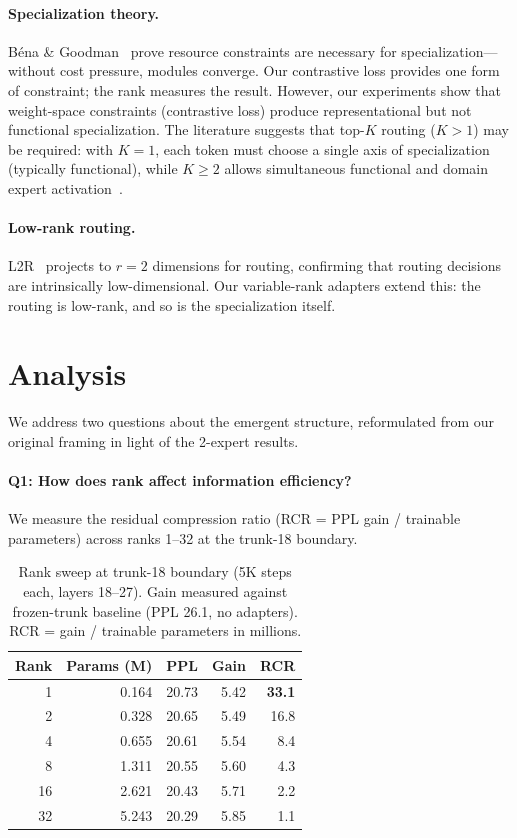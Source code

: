 \documentclass{article}
\begin{document}
\paragraph{Specialization theory.}
B\'{e}na \& Goodman~\cite{bena2025modularity} prove resource constraints are
necessary for specialization---without cost pressure, modules converge. Our
contrastive loss provides one form of constraint; the rank measures the result.
However, our experiments show that weight-space constraints (contrastive loss)
produce representational but not functional specialization. The literature
suggests that top-$K$ routing ($K > 1$) may be required: with $K=1$, each
token must choose a single axis of specialization (typically functional), while
$K \geq 2$ allows simultaneous functional and domain expert
activation~\cite{standing2026, domaindriver2026}.

\paragraph{Low-rank routing.}
L2R~\cite{l2r2026} projects to $r{=}2$ dimensions for routing, confirming that
routing decisions are intrinsically low-dimensional. Our variable-rank adapters
extend this: the routing is low-rank, and so is the specialization itself.

\section{Analysis}
\label{sec:analysis}

We address two questions about the emergent structure, reformulated from
our original framing in light of the 2-expert results.

\paragraph{Q1: How does rank affect information efficiency?}
We measure the residual compression ratio (RCR = PPL gain / trainable
parameters) across ranks 1--32 at the trunk-18 boundary.
\begin{table}[h]
\centering
\caption{Rank sweep at trunk-18 boundary (5K steps each, layers 18--27).
Gain measured against frozen-trunk baseline (PPL 26.1, no adapters).
RCR = gain / trainable parameters in millions.}
\label{tab:rank-sweep}
\begin{tabular}{@{}rrrrr@{}}
\toprule
Rank & Params (M) & PPL & Gain & RCR \\
\midrule
1  & 0.164 & 20.73 & 5.42 & \textbf{33.1} \\
2  & 0.328 & 20.65 & 5.49 & 16.8 \\
4  & 0.655 & 20.61 & 5.54 & 8.4 \\
8  & 1.311 & 20.55 & 5.60 & 4.3 \\
16 & 2.621 & 20.43 & 5.71 & 2.2 \\
32 & 5.243 & 20.29 & 5.85 & 1.1 \\
\bottomrule
\end{tabular}
\end{table}
\end{document}
